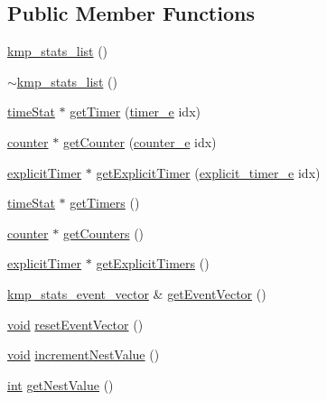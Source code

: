 \subsection*{Public Member Functions}
\begin{DoxyCompactItemize}
\item 
\hyperlink{classkmp__stats__list_a303a3de1a41bdd732d09638e49b473c3}{kmp\-\_\-stats\-\_\-list} ()
\item 
\hyperlink{classkmp__stats__list_ab956d9125fbab4c6bb5dfb8ad3c3753c}{$\sim$kmp\-\_\-stats\-\_\-list} ()
\item 
\hyperlink{classtimeStat}{time\-Stat} $\ast$ \hyperlink{classkmp__stats__list_abeaa2d89d4e1b33a09abcec309dbc2ff}{get\-Timer} (\hyperlink{kmp__stats_8h_ae03f1e0ff609f86afa9b7167a12c6c06}{timer\-\_\-e} idx)
\item 
\hyperlink{classcounter}{counter} $\ast$ \hyperlink{classkmp__stats__list_a810614117dd085f58e22874b6286f5d7}{get\-Counter} (\hyperlink{kmp__stats_8h_a369a3f9687663102f214798ed3915336}{counter\-\_\-e} idx)
\item 
\hyperlink{classexplicitTimer}{explicit\-Timer} $\ast$ \hyperlink{classkmp__stats__list_a2c94bf4592241a44056742cda7380ff0}{get\-Explicit\-Timer} (\hyperlink{kmp__stats_8h_a295442cccb9777c926d7b3addc83cce6}{explicit\-\_\-timer\-\_\-e} idx)
\item 
\hyperlink{classtimeStat}{time\-Stat} $\ast$ \hyperlink{classkmp__stats__list_ab17352ccda160ba48990544a6ed19ab9}{get\-Timers} ()
\item 
\hyperlink{classcounter}{counter} $\ast$ \hyperlink{classkmp__stats__list_ae137735f825eb4fea026124ce790cfe3}{get\-Counters} ()
\item 
\hyperlink{classexplicitTimer}{explicit\-Timer} $\ast$ \hyperlink{classkmp__stats__list_a769790b94a06d33ba8eefb7e52a3d1fb}{get\-Explicit\-Timers} ()
\item 
\hyperlink{classkmp__stats__event__vector}{kmp\-\_\-stats\-\_\-event\-\_\-vector} \& \hyperlink{classkmp__stats__list_ade4a49e6d4c84872804dd0f091647b4b}{get\-Event\-Vector} ()
\item 
\hyperlink{ittnotify__static_8h_af941d56e55e3c5465135b60c4d6343ed}{void} \hyperlink{classkmp__stats__list_a3565f9a861a12168e3f96d3a78f6d5a8}{reset\-Event\-Vector} ()
\item 
\hyperlink{ittnotify__static_8h_af941d56e55e3c5465135b60c4d6343ed}{void} \hyperlink{classkmp__stats__list_ab2bd44c00fe33e5a053cce45d3547625}{increment\-Nest\-Value} ()
\item 
\hyperlink{ittnotify__static_8h_a8b8dcd723308a8cb5d84277c7a3fff70}{int} \hyperlink{classkmp__stats__list_ad84d6680e0777851ae04a175f858addc}{get\-Nest\-Value} ()

\end{DoxyCompactItemize}
